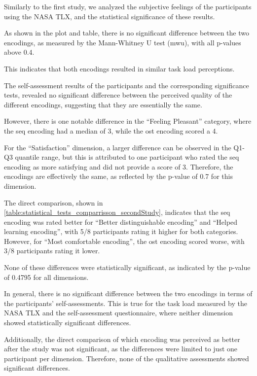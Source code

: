 Similarly to the first study, we analyzed the subjective feelings of the participants using the NASA TLX, and the statistical significance of these results.

As shown in the plot and table, there is no significant difference between the two encodings, as measured by the Mann-Whitney U test (\gls{mwu}), with all p-values above 0.4.

This indicates that both encodings resulted in similar task load perceptions.

The self-assessment results of the participants and the corresponding significance tests, revealed no significant difference between the perceived quality of the different encodings, suggesting that they are essentially the same.

However, there is one notable difference in the \enquote{Feeling Pleasant} category, where the \gls{seq} encoding had a median of 3, while the \gls{ost} encoding scored a 4.

For the \enquote{Satisfaction} dimension, a larger difference can be observed in the Q1-Q3 quantile range, but this is attributed to one participant who rated the \gls{seq} encoding as more satisfying and did not provide a score of 3. Therefore, the encodings are effectively the same, as reflected by the p-value of 0.7 for this dimension.

The direct comparison, shown in \autoref{table:statistical_tests_comparrisson_secondStudy}, indicates that the \gls{seq} encoding was rated better for \enquote{Better distinguishable encoding} and \enquote{Helped learning encoding}, with 5/8 participants rating it higher for both categories. However, for \enquote{Most comfortable encoding}, the \gls{ost} encoding scored worse, with 3/8 participants rating it lower.

None of these differences were statistically significant, as indicated by the p-value of 0.4795 for all dimensions.

In general, there is no significant difference between the two encodings in terms of the participants' self-assessments. This is true for the task load measured by the NASA TLX and the self-assessment questionnaire, where neither dimension showed statistically significant differences.

Additionally, the direct comparison of which encoding was perceived as better after the study was not significant, as the differences were limited to just one participant per dimension. Therefore, none of the qualitative assessments showed significant differences.

